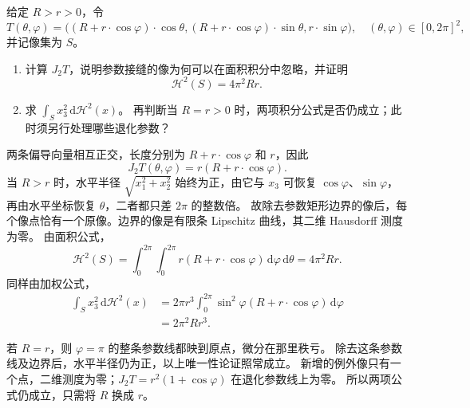 \begin{exercise}\label{b1:ex:17-torus-area}
给定 \(R>r>0\)，令
\[
 T(\theta,\varphi)=
 \bigl((R+r\cdot \cos\varphi)\cdot \cos\theta,
       (R+r\cdot \cos\varphi)\cdot \sin\theta,
       r\cdot \sin\varphi\bigr),
 \quad(\theta,\varphi)\in[0,2\pi]^2,
\]
并记像集为 \(S\)。
\begin{enumerate}
\item\label{b1:item:17-torus-jacobian}
计算 \(J_2T\)，说明参数接缝的像为何可以在面积积分中忽略，并证明
\[
 \mathcal H^2(S)=4\pi^2Rr.
\]
\item\label{b1:item:17-torus-moment}
求 \(\int_Sx_3^2\,\mathrm d\mathcal H^2(x)\)。
再判断当 \(R=r>0\) 时，两项积分公式是否仍成立；此时须另行处理哪些退化参数？
\end{enumerate}
\end{exercise}
\begin{solution}
两条偏导向量相互正交，长度分别为 \(R+r\cdot \cos\varphi\) 和 \(r\)，因此
\[
 J_2T(\theta,\varphi)=r(R+r\cdot \cos\varphi).
\]
当 \(R>r\) 时，水平半径 \(\sqrt{x_1^2+x_2^2}\) 始终为正，由它与 \(x_3\) 可恢复 \(\cos\varphi\)、\(\sin\varphi\)，再由水平坐标恢复 \(\theta\)，二者都只差 \(2\pi\) 的整数倍。
故除去参数矩形边界的像后，每个像点恰有一个原像。边界的像是有限条 Lipschitz 曲线，其二维 Hausdorff 测度为零。
由面积公式，
\[
 \mathcal H^2(S)
 =\int_0^{2\pi}\int_0^{2\pi}r(R+r\cdot \cos\varphi)\,\mathrm d\varphi\,\mathrm d\theta
 =4\pi^2Rr.
\]
同样由加权公式，
\begin{align*}
 \int_Sx_3^2\,\mathrm d\mathcal H^2(x)
 &=2\pi r^3\int_0^{2\pi}\sin^2\varphi(R+r\cdot \cos\varphi)\,\mathrm d\varphi\\
 &=2\pi^2Rr^3.
\end{align*}

若 \(R=r\)，则 \(\varphi=\pi\) 的整条参数线都映到原点，微分在那里秩亏。
除去这条参数线及边界后，水平半径仍为正，以上唯一性论证照常成立。
新增的例外像只有一个点，二维测度为零；\(J_2T=r^2(1+\cos\varphi)\) 在退化参数线上为零。
所以两项公式仍成立，只需将 \(R\) 换成 \(r\)。
\end{solution}

